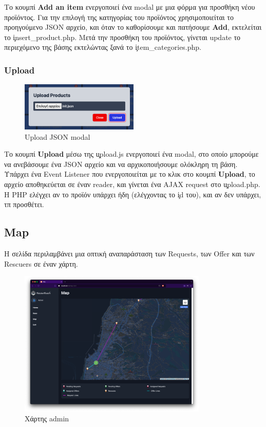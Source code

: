             Το κουμπί \textbf{Add an item} ενεργοποιεί ένα modal με μια φόρμα για προσθήκη νέου προϊόντος.
            Για την επιλογή της κατηγορίας του προϊόντος χρησιμοποιείται το προηγούμενο JSON αρχείο, και όταν το καθορίσουμε και πατήσουμε \textbf{Add}, εκτελείται το \c{insert\_product.php}.
            Μετά την προσθήκη του προϊόντος, γίνεται update το περιεχόμενο της βάσης εκτελώντας ξανά το \c{item\_categories.php}.

        \subsubsection{Upload}
            \begin{figure}[H] \noindent \centering
                \includegraphics[width=0.5\textwidth]{img/admin-base-upload}
                \caption{Upload JSON modal}
            \end{figure}

            Το κουμπί \textbf{Upload} μέσω της \c{upload.js} ενεργοποιεί ένα modal, στο οποίο μπορούμε να ανεβάσουμε ένα JSON αρχείο και να αρχικοποιήσουμε ολόκληρη τη βάση.
            Υπάρχει ένα Event Listener που ενεργοποιείται με το κλικ στο κουμπί \textbf{Upload}, το αρχείο αποθηκεύεται σε έναν reader, και γίνεται ένα AJAX request στο \c{upload.php}.
            Η PHP ελέγχει αν το προϊόν υπάρχει ήδη (ελέγχοντας το \c{id} του), και αν δεν υπάρχει, τπ προσθέτει.

        \pagebreak
        \subsection{Map}
            Η σελίδα περιλαμβάνει μια οπτική αναπαράσταση των Requests, των Offer και των Rescuers σε έναν χάρτη.

            \begin{figure}[H] \noindent \centering
                \includegraphics[width=0.8\textwidth]{img/admin-map}
                \caption{Χάρτης admin}
            \end{figure}

